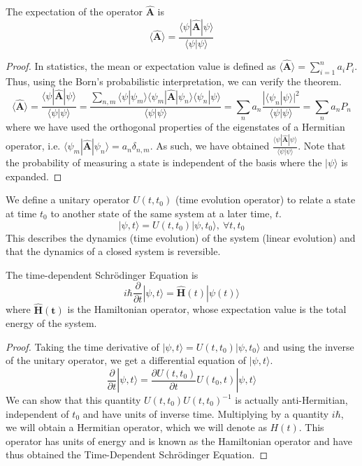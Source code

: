 \documentclass[a4paper]{article}
\begin{document}
\begin{thm}
The expectation of the operator $\mathbf{\hat{A}}$ is
$$\langle\mathbf{\hat{A}}\rangle=\frac{\langle\psi|\mathbf{\hat{A}}|\psi\rangle}{\langle\psi|\psi\rangle}$$
\end{thm}
\begin{proof}
In statistics, the mean or expectation value is defined as $\big\langle\mathbf{\hat{A}}\big\rangle=\sum_{i=1}^{n}a_iP_i$. Thus, using the Born's probabilistic interpretation, we can verify the theorem.
$$\big\langle\mathbf{\hat{A}}\big\rangle=\frac{\big\langle\psi|\mathbf{\hat{A}}|\psi\big\rangle}{\big\langle\psi|\psi\big\rangle}=\frac{\sum_{n,m}\big\langle\psi|\psi_m\big\rangle\big\langle\psi_m|\mathbf{\hat{A}}|\psi_n\big\rangle\big\langle\psi_n|\psi\big\rangle}{\big\langle\psi|\psi\big\rangle}=\sum_na_n\frac{|\big\langle\psi_n|\psi\big\rangle|^2}{\big\langle\psi|\psi\big\rangle}=\sum_na_nP_n$$
where we have used the orthogonal properties of the eigenstates of a Hermitian operator, i.e. $\big\langle\psi_m|\mathbf{\hat{A}}|\psi_n\big\rangle=a_n\delta_{n,m}$. As such, we have obtained $\frac{\langle\psi|\mathbf{\hat{A}}|\psi\rangle}{\langle\psi|\psi\rangle}$. Note that the probability of measuring a state is independent of the basis where the $|\psi\rangle$ is expanded.
\end{proof}
\begin{Note}
We define a unitary operator $U(t,t_0)$ (time evolution operator) to relate a state at time $t_0$ to another state of the same system at a later time, $t$.
$$|\psi,t\big\rangle=U(t,t_0)|\psi,t_0\big\rangle,~\forall t,t_0$$
This describes the dynamics (time evolution) of the system (linear evolution) and that the dynamics of a closed system is reversible.
\end{Note}
\begin{thm}
The time-dependent Schr\"{o}dinger Equation is
$$i\hbar\frac{\partial}{\partial t}|\psi,t\rangle=\mathbf{\hat{H}}(t)|\psi(t)\rangle$$
where $\mathbf{\hat{H}(t)}$ is the Hamiltonian operator, whose expectation value is the total energy of the system.
\end{thm}
\begin{proof}
Taking the time derivative of $|\psi,t\rangle=U(t,t_0)|\psi,t_0\rangle$ and using the inverse of the unitary operator, we get a differential equation of $|\psi,t\big\rangle$.
$$
\frac{\partial}{\partial t}|\psi,t\big\rangle=\frac{\partial U(t,t_0)}{\partial t}U(t_0,t)|\psi,t\big\rangle
$$
We can show that this quantity $U(t,t_0)U(t,t_0)^{-1}$ is actually anti-Hermitian, independent of $t_0$ and have units of inverse time. Multiplying by a quantity $i\hbar$, we will obtain a Hermitian operator, which we will denote as $H(t)$. This operator has units of energy and is known as the Hamiltonian operator and have thus obtained the Time-Dependent Schr\"{o}dinger Equation.
\end{proof}
\end{document}
